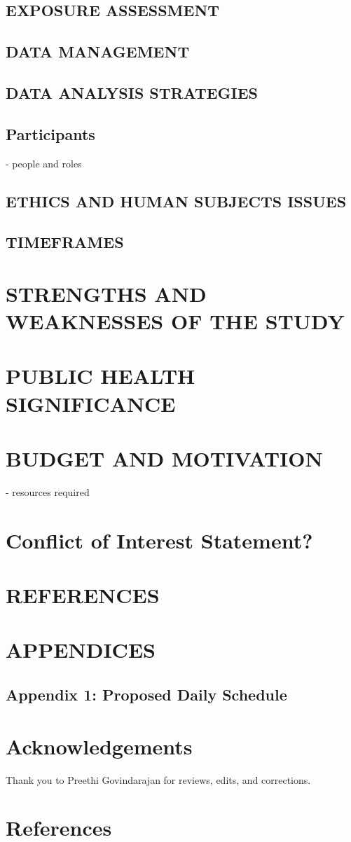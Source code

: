 \documentclass[a4paper, amsfonts, amssymb, amsmath, reprint, showkeys, nofootinbib, twoside]{revtex4-1}
\begin{document}
\subsection{EXPOSURE ASSESSMENT}
\subsection{DATA MANAGEMENT}
\subsection{DATA ANALYSIS STRATEGIES}

\subsection{Participants}
- people and roles

\subsection{ETHICS AND HUMAN SUBJECTS ISSUES}
\subsection{TIMEFRAMES}

\section{STRENGTHS AND WEAKNESSES OF THE STUDY}
\section{PUBLIC HEALTH SIGNIFICANCE}
\section{BUDGET AND MOTIVATION}
- resources required

\section{Conflict of Interest Statement?}

\section{REFERENCES}
\section{APPENDICES}
\subsection{Appendix 1: Proposed Daily Schedule}

\section*{Acknowledgements}

Thank you to Preethi Govindarajan for reviews, edits, and corrections.


\section*{References}

{}


% 
\end{document}
